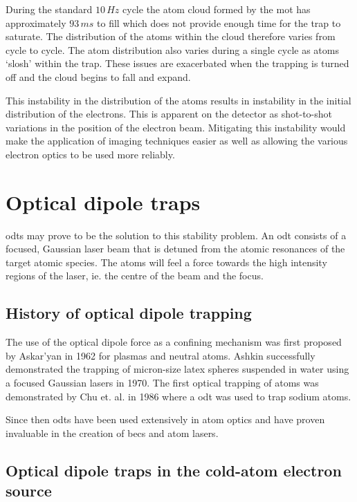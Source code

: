 During the standard $10\,\unit{Hz}$ cycle the atom cloud formed by the \gls{mot} has approximately $93\,\unit{ms}$ to fill which does not provide enough time for the trap to saturate. The distribution of the atoms within the cloud therefore varies from cycle to cycle. The atom distribution also varies during a single cycle as atoms `slosh' within the trap. These issues are exacerbated when the trapping is turned off and the cloud begins to fall and expand.

This instability in the distribution of the atoms results in instability in the initial distribution of the electrons. This is apparent on the detector as shot-to-shot variations in the position of the electron beam. Mitigating this instability would make the application of imaging techniques easier as well as allowing the various electron optics to be used more reliably.

\section{Optical dipole traps}

\Glspl{odt} may prove to be the solution to this stability problem. An \gls{odt} consists of a focused, Gaussian laser beam that is detuned from the atomic resonances of the target atomic species. The atoms will feel a force towards the high intensity regions of the laser, ie. the centre of the beam and the focus.

\subsection{History of optical dipole trapping}
The use of the optical dipole force as a confining mechanism was first proposed by Askar'yan in 1962\cite{askaryan_effects_1962} for plasmas and neutral atoms. Ashkin successfully demonstrated the trapping of micron-size latex spheres suspended in water using a focused Gaussian lasers in 1970\cite{ashkin_acceleration_1970}. The first optical trapping of atoms was demonstrated by Chu et. al. in 1986\cite{chu_experimental_1986} where a \gls{odt} was used to trap sodium atoms.

Since then \glspl{odt} have been used extensively in atom optics and have proven invaluable in the creation of \glspl{bec} and atom lasers.

\subsection{Optical dipole traps in the cold-atom electron source}

